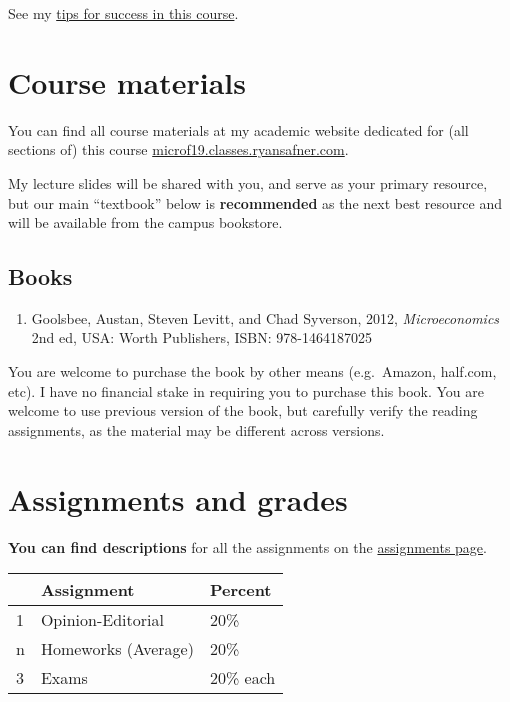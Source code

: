 \documentclass{article}
\providecommand{\tightlist}{%
  \setlength{\itemsep}{0pt}\setlength{\parskip}{0pt}}
\begin{document}
See my
\href{http://microf19.classes.ryansafner.com/reference\#tips}{tips for
success in this course}.

\hypertarget{course-materials}{%
\section{Course materials}\label{course-materials}}

You can find all course materials at my academic website dedicated for
(all sections of) this course
\href{http://microf19.classes.ryansafner.com}{microf19.classes.ryansafner.com}.

My lecture slides will be shared with you, and serve as your primary
resource, but our main ``textbook'' below is \textbf{recommended} as the
next best resource and will be available from the campus bookstore.

\hypertarget{books}{%
\subsection{Books}\label{books}}

\begin{enumerate}
\def\labelenumi{\arabic{enumi}.}
\tightlist
\item
  Goolsbee, Austan, Steven Levitt, and Chad Syverson, 2012,
  \emph{Microeconomics} 2nd ed, USA: Worth Publishers, ISBN:
  978-1464187025
\end{enumerate}

You are welcome to purchase the book by other means (e.g.~Amazon,
half.com, etc). I have no financial stake in requiring you to purchase
this book. You are welcome to use previous version of the book, but
carefully verify the reading assignments, as the material may be
different across versions.

\hypertarget{assignments-and-grades}{%
\section{Assignments and grades}\label{assignments-and-grades}}

\textbf{You can find descriptions} for all the assignments on the
\href{http://metricsf19.classes.ryansafner.com/assignments/}{assignments
page}.

\begin{center}

\begin{tabular}{lll}
\toprule
 & Assignment & Percent\\
\midrule
1 & Opinion-Editorial & 20\%\\
n & Homeworks (Average) & 20\%\\
3 & Exams & 20\% each\\
\bottomrule
\end{tabular}
\end{center}
\end{document}
